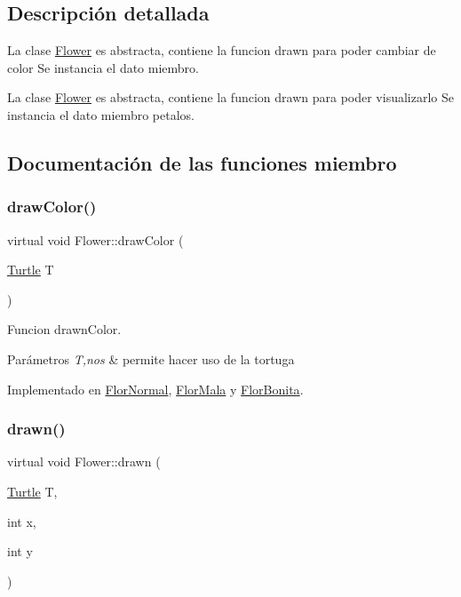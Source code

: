 \subsection{Descripción detallada}
La clase \hyperlink{classFlower}{Flower} es abstracta, contiene la funcion drawn para poder cambiar de color  Se instancia el dato miembro. 

La clase \hyperlink{classFlower}{Flower} es abstracta, contiene la funcion drawn para poder visualizarlo  Se instancia el dato miembro petalos. 

\subsection{Documentación de las funciones miembro}
\mbox{\label{classFlower_a23dd402c7227bf81c42d7e57772c15bf}} 
\subsubsection{\texorpdfstring{draw\+Color()}{drawColor()}}
{\footnotesize\ttfamily virtual void Flower\+::draw\+Color (\begin{DoxyParamCaption}\item[{\hyperlink{classTurtle}{Turtle}}]{T }\end{DoxyParamCaption})\hspace{0.3cm}{\ttfamily [pure virtual]}}

Funcion drawn\+Color. 
\begin{DoxyParams}{Parámetros}
{\em T,nos} & permite hacer uso de la tortuga \\
\hline
\end{DoxyParams}


Implementado en \hyperlink{classFlorNormal_a0ae303fc4e8528a3bd8f69e62a8b32c4}{Flor\+Normal}, \hyperlink{classFlorMala_a23657c9a53aa5823c03c688d52d56e21}{Flor\+Mala} y \hyperlink{classFlorBonita_a22345f27b2f33479d5d5b89cd7add93b}{Flor\+Bonita}.

\mbox{\label{classFlower_af01eea570f9d02e16cda1d86ee97633c}} 
\subsubsection{\texorpdfstring{drawn()}{drawn()}}
{\footnotesize\ttfamily virtual void Flower\+::drawn (\begin{DoxyParamCaption}\item[{\hyperlink{classTurtle}{Turtle}}]{T,  }\item[{int}]{x,  }\item[{int}]{y }\end{DoxyParamCaption})\hspace{0.3cm}{\ttfamily [pure virtual]}}

